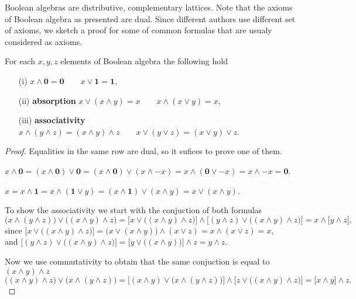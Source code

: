 Boolean algebras are distributive, complementary lattices.
Note that the axioms of Boolean algebra as presented are dual. Since
different authors use different set of axioms, we sketch a proof
for some of common formulas that are usualy considered as axioms.

\begin{lemma}
 For each $x,y,z$ elements of Boolean algebra the following hold
\begin{itemize}
 \item[(i)] $x \wedge \mathbf 0 = \mathbf 0 \qquad x \vee \mathbf 1 = \mathbf 1$,
 \item[(ii)] {\bfseries absorption}   $x \vee (x \wedge y) = x \qquad x \wedge (x \vee y) = x $,
 \item[(iii)] {\bfseries associativity} $x\wedge (y \wedge z) = (x \wedge y) \wedge z \qquad x \vee (y \vee z) = (x \vee y) \vee z$.
\end{itemize}
\end{lemma}

\begin{proof}
 Equalities in the same row are dual, so it sufices to prove one of them.

\smallskip

 $x \wedge \mathbf{0} = (x \wedge \mathbf{0}) \vee \mathbf{0} =
	(x \wedge \mathbf{0}) \vee (x \wedge -x) = x \wedge (\mathbf{0} \vee -x) = x \wedge -x = \mathbf{0}$.

\smallskip

 $x = x \wedge \mathbf{1} = x \wedge (\mathbf{1} \vee y) = (x \wedge \mathbf{1}) \vee (x \wedge y)
	= x \vee (x \wedge y)$.

\smallskip

 To show the associativity we start with the conjuction of both
formulas
$$
\bigl( x \wedge (y \wedge z) \bigr) \vee \bigl( (x \wedge y) \wedge z \bigr) =
	\bigl[ x \vee \bigl( (x \wedge y) \wedge z \bigr) \bigr] \wedge
	\bigl[ (y \wedge z) \vee \bigl( (x \wedge y) \wedge z \bigr) \bigr] = x \wedge \bigl[ y \wedge z \bigr],
$$
since $\bigl[ x \vee \bigl( (x \wedge y) \wedge z \bigr) \bigr] = \bigl( x \vee (x \wedge y) \bigr) \wedge (x \vee z)
= x \wedge (x \vee z) = x$, \\
and $\bigl[ (y \wedge z) \vee \bigl( (x \wedge y) \wedge z \bigr) \bigr] =
\bigl[y \vee \bigl( (x \wedge y) \bigr) \bigr] \wedge z
 = y \wedge z$.
\smallskip

Now we use commutativity to obtain that the same conjuction is equal to $(x \wedge y) \wedge z$
$$
 \bigl( (x \wedge y) \wedge z \bigr) \vee \bigl( x \wedge (y \wedge z) \bigr) =
	\bigl[ (x \wedge y) \vee \bigl( x \wedge ( y \wedge z) \bigr) \bigr] \wedge
	\bigl[ z \vee \bigl( (x \wedge y) \wedge z \bigr) \bigr] = \bigl[ x \wedge y \bigr] \wedge z.
$$
\end{proof}


